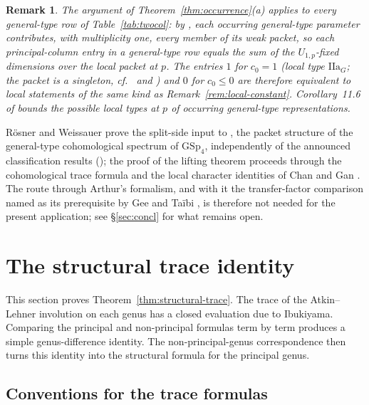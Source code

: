 \documentclass[10pt,a4paper]{amsart}
\newtheorem{remark}[theorem]{Remark}
\newcommand{\GSp}{\mathrm{GSp}}
\begin{document}
	\begin{remark}\label{rem:other-rows}
		The argument of Theorem~\ref{thm:occurrence}\textup{(a)} applies to
		every general-type row of Table~\ref{tab:twocol}: by
		\cite[Thm.~11.4]{RoesnerWeissauer2021}, each occurring general-type
		parameter contributes, with multiplicity one, every member of its
		weak packet, so each principal-column entry in a general-type row
		equals the sum of the $U_{1,p}$-fixed dimensions over the local
		packet at $p$. The entries $1$ for $c_0=1$ (local type
		$\mathrm{IIa}_G$; the packet is a singleton, cf.\
		\cite[\S3]{Schmidt2018} and \cite[Table~3]{RoesnerWeissauer2021})
		and $0$ for $c_0\le0$ are therefore equivalent to local statements
		of the same kind as Remark~\ref{rem:local-constant}.
		Corollary~11.6 of \cite{RoesnerWeissauer2021} bounds the possible
		local types at $p$ of occurring general-type representations.
	\end{remark}
	
	R\"osner and Weissauer prove the split-side input to
	\cite[Thm.~11.4]{RoesnerWeissauer2021}, the packet structure of the
	general-type cohomological spectrum of $\GSp_4$, independently of the
	announced classification results
	(\cite[\S10]{RoesnerWeissauer2021}); the proof of the lifting theorem
	proceeds through the cohomological trace formula and the local
	character identities of Chan and Gan \cite{ChanGan2015}. The route
	through Arthur's formalism, and with it the transfer-factor comparison
	named as its prerequisite by Gee and Ta\"ibi
	\cite[Rem.~7.4.8]{GeeTaibi}, is therefore not needed for the present
	application; see \S\ref{sec:concl} for what remains open.
	
	
	\section{The structural trace identity}
	\label{sec:trace}
	
	This section proves Theorem~\ref{thm:structural-trace}. The trace of the
	Atkin--Lehner involution on each genus has a closed evaluation due to
	Ibukiyama. Comparing the principal and non-principal formulas term by term
	produces a simple genus-difference identity. The non-principal-genus
	correspondence then turns this identity into the structural formula for the
	principal genus.
	
	\subsection{Conventions for the trace formulas}
	\label{ss:trace-conventions}
	
\end{document}

